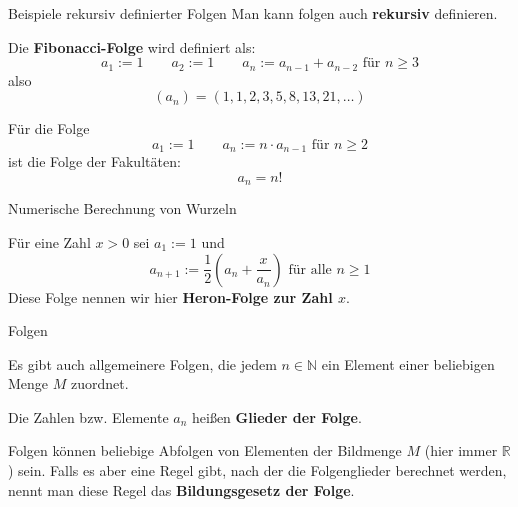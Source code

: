 \begin{frame}{Beispiele rekursiv definierter Folgen}
		Man kann folgen auch \textbf{rekursiv} definieren. 
	\begin{example}
		Die \textbf{Fibonacci-Folge} wird definiert als:
		\[
			a_{1} := 1 \qquad a_{2} := 1 \qquad a_{n} := a_{n-1} + a_{n-2} \mbox{ für } n \geq 3
		\]
		also 
		\[
			 \left( a_{n} \right) = \left( 1, 1, 2, 3, 5, 8, 13, 21, \ldots \right) 
		\]
	\end{example}
	\begin{example}
		Für die Folge
		\[
		a_{1} := 1 \qquad a_{n} := n \cdot a_{n-1} \mbox{ für } n \geq 2
		\]
		ist die Folge der Fakultäten:
		\[
			a_{n} = n!
		\]
	\end{example}
\end{frame}

\begin{frame}{Numerische Berechnung von Wurzeln}
	\begin{example}
		Für eine Zahl $x > 0$ sei $a_{1} := 1$ und
		\[
			a_{n+1} := \frac{1}{2} \left( a_{n} + \frac{x}{a_{n}} \right) \mbox{ für alle } n \geq 1 
		\]
		Diese Folge nennen wir hier \textbf{Heron-Folge zur Zahl $x$}.
	\end{example} 
\end{frame}

\begin{frame}{Folgen}
	\begin{bemerkung}
		Es gibt auch allgemeinere Folgen, die jedem $n \in \mathbb{N}$ ein Element einer beliebigen Menge $M$ zuordnet.
		
		Die Zahlen bzw. Elemente $a_{n}$ heißen \textbf{Glieder der Folge}.
		
		Folgen können beliebige Abfolgen von Elementen der Bildmenge $M$ (hier immer $\mathbb{R}$) sein. Falls es aber eine Regel gibt, nach der die Folgenglieder berechnet werden, nennt man diese Regel das \textbf{Bildungsgesetz der Folge}.
	\end{bemerkung}
\end{frame}

